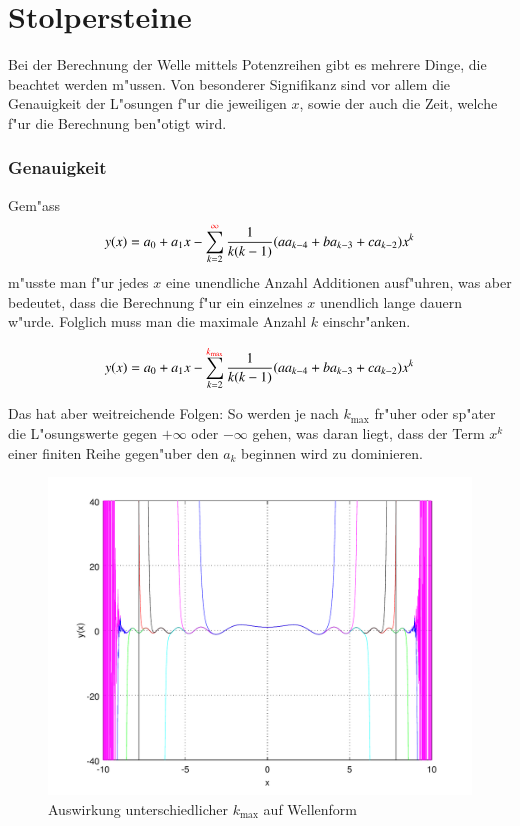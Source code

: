 \section{Stolpersteine}

Bei der Berechnung der Welle mittels Potenzreihen gibt es mehrere Dinge, die 
beachtet werden m"ussen. Von besonderer Signifikanz sind vor allem die 
Genauigkeit der L"osungen f"ur die jeweiligen $x$, sowie der auch die Zeit, 
welche f"ur die Berechnung ben"otigt wird.


\subsubsection{Genauigkeit}
Gem"ass
\begin{equation*}
	y(x) = a_0 + a_1x 
	-\sum_{k=2}^{\textcolor{red}{\infty}}\frac{1}{k(k-1)} 
	(aa_{k-4}+ba_{k-3}+ca_{k-2})x^k
\end{equation*}
m"usste man f"ur jedes $x$ eine unendliche Anzahl Additionen ausf"uhren, was 
aber bedeutet, dass die Berechnung f"ur ein einzelnes $x$ unendlich lange 
dauern w"urde. Folglich muss man die maximale Anzahl $k$ einschr"anken.

\begin{equation*}
	y(x) = a_0 + a_1x 
	-\sum_{k=2}^{\textcolor{red}{k_{\text{max}}}}\frac{1}{k(k-1)} 
	(aa_{k-4}+ba_{k-3}+ca_{k-2})x^k
\end{equation*}

Das hat aber weitreichende Folgen: So werden je nach $k_{\text{max}}$ fr"uher 
oder sp"ater die L"osungswerte gegen $+\infty$ oder $-\infty$ gehen, was daran 
liegt, dass der Term $x^k$ einer finiten Reihe gegen"uber den $a_k$ beginnen 
wird zu dominieren.

\begin{figure}
	\includegraphics[scale=0.65]{./wellen/images/kmax/kmax.pdf}
	\caption{Auswirkung unterschiedlicher $k_{\text{max}}$ auf Wellenform}
	\label{fig:wellen:variablekmax}
\end{figure}

